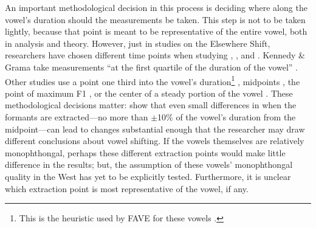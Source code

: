 An important methodological decision in this process is deciding where along the vowel's duration should the measurements be taken. This step is not to be taken lightly, because that point is meant to be representative of the entire vowel, both in analysis and theory. However, just in studies on the Elsewhere Shift, researchers have chosen different time points when studying \trap, \dress, and \kit. Kennedy \& Grama take measurements ``at the first quartile of the duration of the vowel'' \citeyearpar[46]{kennedy_grama_2012}. Other studies use a point one third into the vowel's duration\footnote{This is the heuristic used by FAVE for these vowels \citep{labov_etal_2013, rosenfelder_etal_2014}.} \citep{hall_lew_etal_2015, cardoso_etal_2016_pads, brumbaugh_koops_2017_pads, fridland_kendall_2017_pads, roeder_etal_2018}, midpoints \citep{podesva_2011, podesva_etal_2015, wassink_2015, bar_el_etal_2017, pratt_2018}, the point of maximum F1 \citep{boberg_2008, presnyakova_etal_2018}, or the center of a steady portion of the vowel \citep[15--16]{holland_brandenburg_2017_pads}. These methodological decisions matter: \citet{kendall_vaughn_2015} show that even small differences in when the formants are extracted---no more than $\pm$10\% of the vowel's duration from the midpoint---can lead to changes substantial enough that the researcher may draw different conclusions about vowel shifting. If the vowels themselves are relatively monophthongal, perhaps these different extraction points would make little difference in the results; but, the assumption of these vowels' monophthongal quality in the West has yet to be explicitly tested. Furthermore, it is unclear which extraction point is most representative of the vowel, if any.

